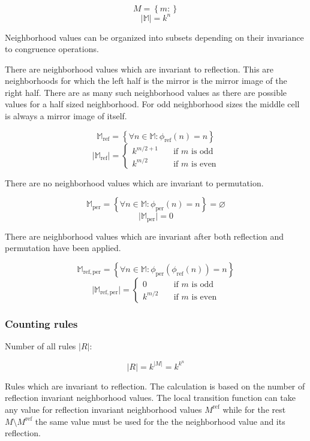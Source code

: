 \documentclass{ijuc}
\begin{document}
\[ M = \left\{ m : \right\} \]
\[ \vert \mathbb{M} \vert = k^n \]

Neighborhood values can be organized into subsets depending on their invariance to congruence operations.

There are neighborhood values which are invariant to reflection. This are neighborhoods for which the
left half is the mirror is the mirror image of the right half. There are as many such neighborhood
values as there are possible values for a half sized neighborhood. For odd neighborhood sizes the middle
cell is always a mirror image of itself.

\[ \mathbb{M}_\mathrm{ref} = \left\{ \forall n \in \mathbb{M} : \phi_\mathrm{ref}(n) = n \right\} \]
\[ \vert \mathbb{M}_\mathrm{ref} \vert = \left\{ 
  \begin{array}{ll}
    {k^{m/2+1}} & \quad \textrm{if $m$ is odd }\\
    {k^{m/2  }} & \quad \textrm{if $m$ is even}
  \end{array} \right.
\]

There are no neighborhood values which are invariant to permutation.

\[ \mathbb{M}_\mathrm{per} = \left\{ \forall n \in \mathbb{M} : \phi_\mathrm{per}(n) = n \right\} = \varnothing \]
\[ \vert \mathbb{M}_\mathrm{per} \vert = 0 \]

There are neighborhood values which are invariant after both reflection and permutation have been applied.

\[ \mathbb{M}_\mathrm{ref,per} = \left\{ \forall n \in \mathbb{M} : \phi_\mathrm{per}(\phi_\mathrm{ref}(n)) = n \right\} \]
\[ \vert \mathbb{M}_\mathrm{ref,per} \vert = \left\{ 
  \begin{array}{ll}
    {0        } & \quad \textrm{if $m$ is odd }\\
    {k^{m/2  }} & \quad \textrm{if $m$ is even}
  \end{array} \right.
\]

\subsubsection{Counting rules}

Number of all rules \(\vert R \vert\):

\[ \vert R \vert = k^{\vert M \vert} = k^{k^n} \]

Rules which are invariant to reflection. The calculation is based on the number of
reflection invariant neighborhood values. The local transition function can take any
value for reflection invariant neighborhood values \(M^\mathrm{ref}\) while for the
rest \(M  \setminus M^\mathrm{ref}\) the same value must be used
for the the neighborhood value and its reflection.
\end{document}
